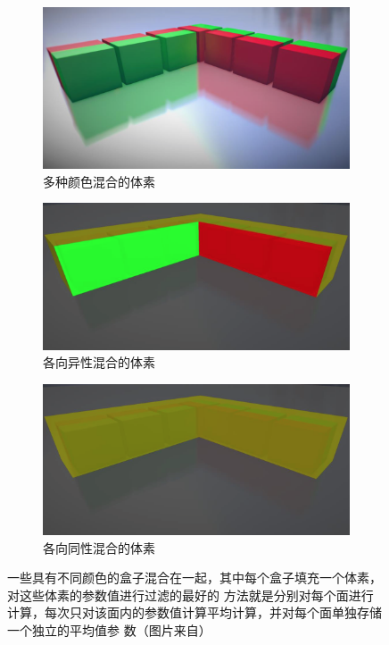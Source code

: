 \begin{figure}
\begin{fullwidth}
	\begin{subfigure}[b]{0.33\thewidth}
		\includegraphics[width=\textwidth]{figures/vct/vct-11-2}
		\caption{多种颜色混合的体素}
	\end{subfigure}
	\begin{subfigure}[b]{0.33\thewidth}
		\includegraphics[width=\textwidth]{figures/vct/vct-11-3}
		\caption{各向异性混合的体素}
	\end{subfigure}
	\begin{subfigure}[b]{0.33\thewidth}
		\includegraphics[width=\textwidth]{figures/vct/vct-11-4}
		\caption{各向同性混合的体素}
	\end{subfigure}
	\caption{一些具有不同颜色的盒子混合在一起，其中每个盒子填充一个体素，对这些体素的参数值进行过滤的最好的 方法就是分别对每个面进行计算，每次只对该面内的参数值计算平均计算，并对每个面单独存储一个独立的平均值参 数（图片来自\cite{a:TheTechnologyofTheTomorrowChildren}）}
	\label{f:vct-11}
\end{fullwidth}
\end{figure}



